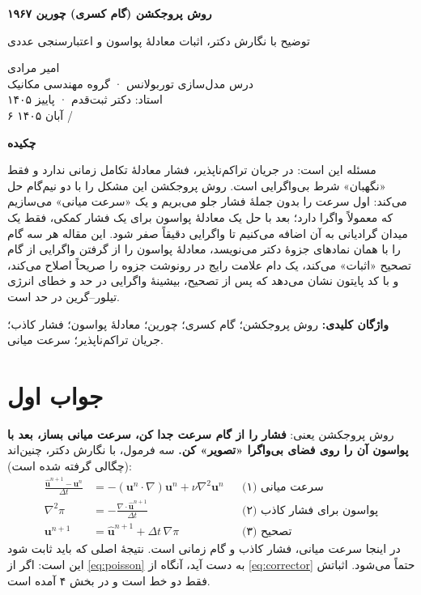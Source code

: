 \documentclass[12pt,a4paper]{article}
\begin{document}
\begin{center}
{\Large\bfseries روش پروجکشن (گام کسری) چورین ۱۹۶۷\par}
\vspace{1ex}
{\large توضیح با نگارش دکتر، اثبات معادلهٔ پواسون و اعتبارسنجی عددی\par}
\vspace{1ex}
{\small امیر مرادی\\
درس مدل‌سازی توربولانس · گروه مهندسی مکانیک\\
استاد: دکتر ثبت‌قدم · پاییز ۱۴۰۵\\
۶ آبان ۱۴۰۵ / \par}
\end{center}

\begin{center}{\large\bfseries چکیده}\end{center}
مسئله این است: در جریان تراکم‌ناپذیر، فشار معادلهٔ تکامل زمانی ندارد و فقط
«نگهبان» شرط بی‌واگرایی است. روش پروجکشن این مشکل را با دو نیم‌گام حل می‌کند:
اول سرعت را بدون جملهٔ فشار جلو می‌بریم و یک «سرعت میانی» می‌سازیم که
معمولاً واگرا دارد؛ بعد با حل یک معادلهٔ پواسون برای یک فشار کمکی، فقط یک
میدان گرادیانی به آن اضافه می‌کنیم تا واگرایی دقیقاً صفر شود. این مقاله
هر سه گام را با همان نمادهای جزوهٔ دکتر می‌نویسد، معادلهٔ پواسون را از
گرفتن واگرایی از گام تصحیح «اثبات» می‌کند، یک دام علامت رایج در رونوشت
جزوه را صریحاً اصلاح می‌کند، و با کد پایتون نشان می‌دهد که پس از تصحیح،
بیشینهٔ واگرایی در حد  و خطای انرژی تیلور--گرین در حد
 است.

\noindent\textbf{واژگان کلیدی:} روش پروجکشن؛ گام کسری؛ چورین؛ معادلهٔ پواسون؛
فشار کاذب؛ جریان تراکم‌ناپذیر؛ سرعت میانی.

\section{جواب اول}
روش پروجکشن یعنی: \textbf{فشار را از گام سرعت جدا کن، سرعت میانی بساز،
بعد با پواسون آن را روی فضای بی‌واگرا «تصویر» کن.} سه فرمول، با نگارش دکتر،
چنین‌اند (چگالی  گرفته شده است):
\begin{align}
\frac{\hat{\mathbf{u}}^{n+1}-\mathbf{u}^n}{\Delta t}
&= -(\mathbf{u}^n\cdot\nabla)\mathbf{u}^n
   + \nu\nabla^2\mathbf{u}^n
   &&\text{(۱) سرعت میانی} \label{eq:predictor}\\
\nabla^2\pi &= -\frac{\nabla\cdot\hat{\mathbf{u}}^{n+1}}{\Delta t}
   &&\text{(۲) پواسون برای فشار کاذب} \label{eq:poisson}\\
\mathbf{u}^{n+1} &= \hat{\mathbf{u}}^{n+1} + \Delta t\,\nabla\pi
   &&\text{(۳) تصحیح} \label{eq:corrector}
\end{align}
در اینجا  سرعت میانی، \lr{$\pi$} فشار کاذب
 و  گام زمانی است. نتیجهٔ اصلی که باید
ثابت شود این است: اگر \lr{$\pi$} از \eqref{eq:poisson} به دست آید، آنگاه
از \eqref{eq:corrector} حتماً  می‌شود.
اثباتش فقط دو خط است و در بخش ۴ آمده است.
\end{document}

